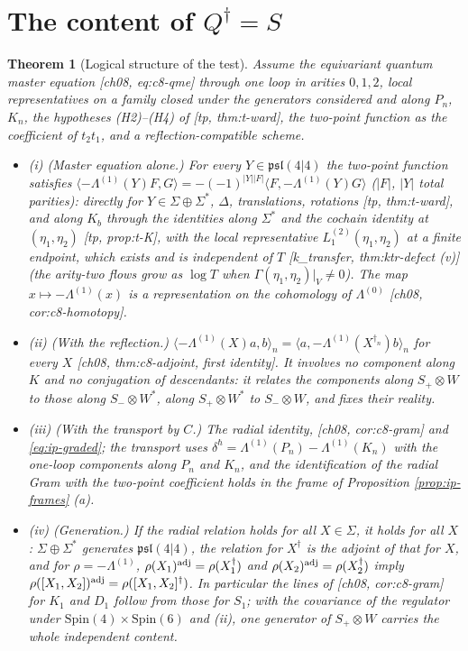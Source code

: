 \documentclass[11pt]{report}
\theoremstyle{plain}
\newtheorem{theorem}{Theorem}[chapter]
\theoremstyle{definition}
\numberwithin{equation}{chapter}
\begin{document}
\section{The content of $Q^\dagger=S$}

\begin{theorem}[Logical structure of the test]
\label{thm:ip-logic}
Assume the equivariant quantum master equation [ch08, eq:c8-qme] through one loop in arities $0,1,2$, local representatives on a family closed under the generators considered and along $P_n$, $K_n$, the hypotheses (H2)--(H4) of [tp, thm:t-ward], the two-point function as the coefficient of $t_2t_1$, and a reflection-compatible scheme.
\begin{itemize}
\item (i) (Master equation alone.) For every $Y\in\mathfrak{psl}(4|4)$ the two-point function satisfies $\langle-\Lambda^{(1)}(Y)F,G\rangle=-(-1)^{|Y||F|}\langle F,-\Lambda^{(1)}(Y)G\rangle$ ($|F|$, $|Y|$ total parities): directly for $Y\in\Sigma\oplus\Sigma^*$, $\Delta$, translations, rotations [tp, thm:t-ward], and along $K_b$ through the identities along $\Sigma^*$ and the cochain identity at $(\eta_1,\eta_2)$ [tp, prop:t-K], with the local representative $L_1^{(2)}(\eta_1,\eta_2)$ at a finite endpoint, which exists and is independent of $T$ [k\_transfer, thm:ktr-defect (v)] (the arity-two flows grow as $\log T$ when $\Gamma(\eta_1,\eta_2)|_V\neq0$). The map $x\mapsto-\Lambda^{(1)}(x)$ is a representation on the cohomology of $\Lambda^{(0)}$ [ch08, cor:c8-homotopy].
\item (ii) (With the reflection.) $\langle-\Lambda^{(1)}(X)a,b\rangle_n=\langle a,-\Lambda^{(1)}(X^{\dagger_n})b\rangle_n$ for every $X$ [ch08, thm:c8-adjoint, first identity]. It involves no component along $K$ and no conjugation of descendants: it relates the components along $S_+\otimes W$ to those along $S_-\otimes W^*$, along $S_+\otimes W^*$ to $S_-\otimes W$, and fixes their reality.
\item (iii) (With the transport by $C$.) The radial identity, [ch08, cor:c8-gram] and \eqref{eq:ip-graded}; the transport uses $\delta^\hbar=\Lambda^{(1)}(P_n)-\Lambda^{(1)}(K_n)$ with the one-loop components along $P_n$ and $K_n$, and the identification of the radial Gram with the two-point coefficient holds in the frame of Proposition \ref{prop:ip-frames} (a).
\item (iv) (Generation.) If the radial relation holds for all $X\in\Sigma$, it holds for all $X$: $\Sigma\oplus\Sigma^*$ generates $\mathfrak{psl}(4|4)$, the relation for $X^\dagger$ is the adjoint of that for $X$, and for $\rho=-\Lambda^{(1)}$, $\rho(X_1)^{\rm adj}=\rho(X_1^\dagger)$ and $\rho(X_2)^{\rm adj}=\rho(X_2^\dagger)$ imply $\rho([X_1,X_2])^{\rm adj}=\rho([X_1,X_2]^\dagger)$. In particular the lines of [ch08, cor:c8-gram] for $K_1$ and $D_1$ follow from those for $S_1$; with the covariance of the regulator under $\mathrm{Spin}(4)\times\mathrm{Spin}(6)$ and (ii), one generator of $S_+\otimes W$ carries the whole independent content.

\end{itemize}
\end{theorem}
\end{document}
